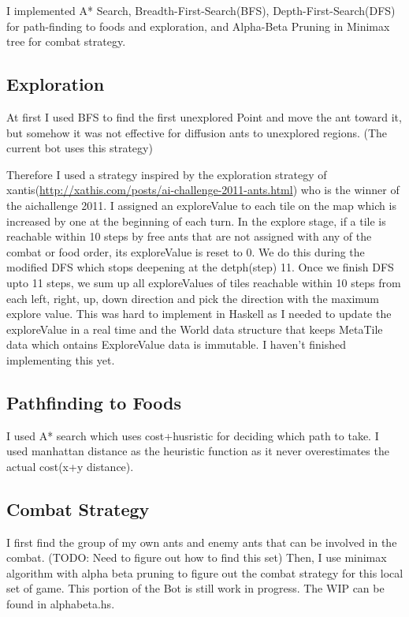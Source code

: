 \documentclass[11pt]{article}
\begin{document}
I implemented A* Search, Breadth-First-Search(BFS), Depth-First-Search(DFS) for path-finding to foods and exploration, and Alpha-Beta Pruning in Minimax tree for combat strategy. 
\subsection{Exploration}
\label{sec-4-1}


At first I used BFS to find the first unexplored Point and move the ant toward it, but somehow it was not effective for diffusion ants to unexplored regions. (The current bot uses this strategy)

Therefore I used a strategy inspired by the exploration strategy of xantis(\href{http://xathis.com/posts/ai-challenge-2011-ants.html}{http://xathis.com/posts/ai-challenge-2011-ants.html}) who is the winner of the aichallenge 2011. I assigned an exploreValue to each tile on the map which is increased by one at the beginning of each turn. In the explore stage, if a tile is reachable within 10 steps by free ants that are not assigned with any of the combat or food order, its exploreValue is reset to 0. We do this during the modified DFS which stops deepening at the detph(step) 11. Once we finish DFS upto 11 steps, we sum up all exploreValues of tiles reachable within 10 steps from each left, right, up, down direction and pick the direction with the maximum explore value. This was hard to implement in Haskell as I needed to update the exploreValue in a real time and the World data structure that keeps MetaTile data which ontains ExploreValue data is immutable. I haven't finished implementing this yet.
\subsection{Pathfinding to Foods}
\label{sec-4-2}


I used A* search which uses cost+husristic for deciding which path to take. I used manhattan distance as the heuristic function as it never overestimates the actual cost(x+y distance).
\subsection{Combat Strategy}
\label{sec-4-3}


I first find the group of my own ants and enemy ants that can be involved in the combat. (TODO: Need to figure out how to find this set) Then, I use minimax algorithm with alpha beta pruning to figure out the combat strategy for this local set of game. This portion of the Bot is still work in progress. The WIP can be found in alphabeta.hs.
\end{document}
